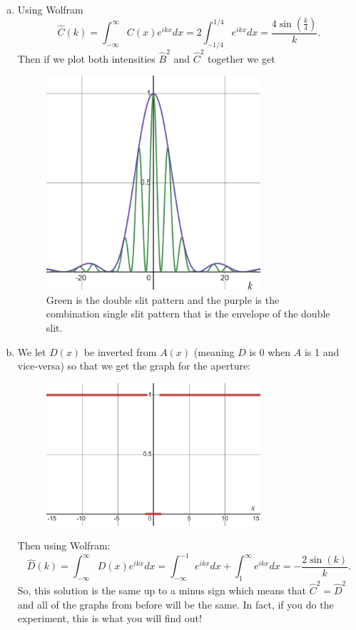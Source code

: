 \documentclass[12pt]{article} %
\begin{document}
\begin{solution}
\begin{enumerate}[(a)]
\item Using Wolfram
	\[
	\hat{C}(k) = \int_{-\infty}^\infty C(x) e^{ikx}dx = 2\int_{-1/4}^{1/4} e^{ikx}dx = \frac{4 \sin\left(\frac{k}{4}\right)}{k}.
	\]
Then if we plot both intensities $\hat{B}^2$ and $\hat{C}^2$ together we get
\begin{figure}[H]
	\centering
	\includegraphics[width=0.75\textwidth]{envelope.png}
	\caption{Green is the double slit pattern and the purple is the combination single slit pattern that is the envelope of the double slit.}
\end{figure}

\item We let $D(x)$ be inverted from $A(x)$ (meaning $D$ is 0 when $A$ is 1 and vice-versa) so that we get the graph for the aperture:
\begin{figure}[H]
	\centering
	\includegraphics[width=0.75\textwidth]{hair_aperture.png}
\end{figure}
Then using Wolfram:
	\[
	\hat{D}(k) = \int_{-\infty}^\infty D(x) e^{ikx}dx = \int_{-\infty}^{-1} e^{ikx}dx + \int_{1}^{\infty} e^{ikx}dx= -\frac{2 \sin(k)}{k}.
	\]
So, this solution is the same up to a minus sign which means that $\hat{C}^2=\hat{D}^2$ and all of the graphs from before will be the same. In fact, if you do the experiment, this is what you will find out!

\end{enumerate}
\end{solution} 
\end{document}
